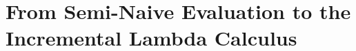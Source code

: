 \section{From Semi-Naive Evaluation to the Incremental Lambda Calculus}
\label{sec:seminaive-and-ilc}